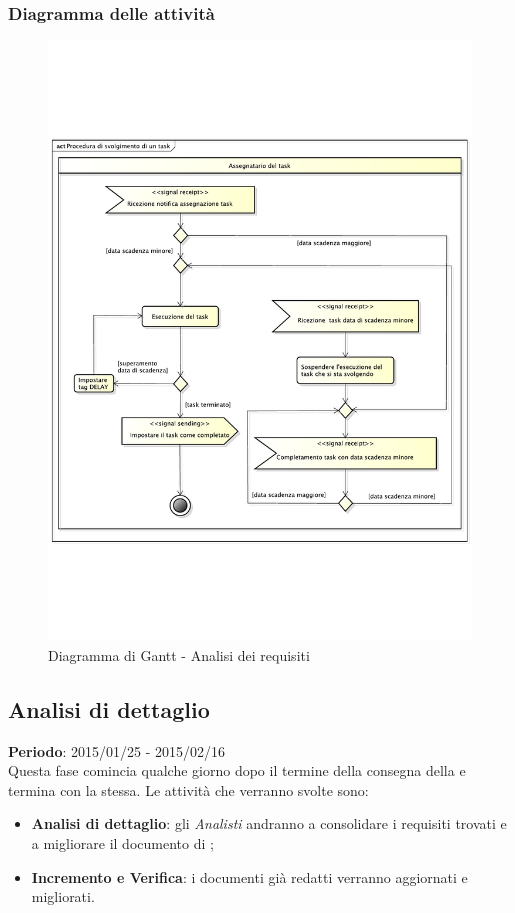 		\subsubsection{Diagramma delle attività} %
		\label{ssub:diagramma_delle_attivita}
			\begin{figure}[htbp]
				\centering
				\includegraphics[width=14cm]{images/proc_svolgimento_task.pdf}
				\caption{Diagramma di Gantt - Analisi dei requisiti}
				\label{fig:gantt_analisi_requisiti}				
			\end{figure}
	
	
	\subsection{Analisi di dettaglio} %
	\label{sub:analisi_di_dettaglio}
	\textbf{Periodo}: 2015/01/25 - 2015/02/16 \\
	Questa fase comincia qualche giorno dopo il termine della consegna della \RR{} e termina con la \RR{} stessa.
	Le attività che verranno svolte sono:
		\begin{itemize}
			\item \textbf{Analisi di dettaglio}: gli \emph{Analisti} andranno a consolidare i requisiti trovati e a migliorare il documento di \docNameVersionAdR;
			\item \textbf{Incremento e Verifica}: i documenti già redatti verranno aggiornati e migliorati.
		\end{itemize}
	
